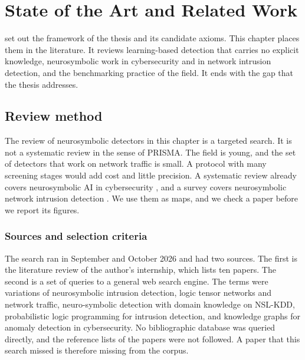 \chapter{State of the Art and Related Work}
\label{ch:related-work}

 set out the framework of the thesis and its candidate axioms. This
chapter places them in the literature. It reviews learning-based
detection that carries no explicit knowledge, neurosymbolic work in
cybersecurity and in network intrusion detection, and the benchmarking
practice of the field. It ends with the gap that the thesis addresses.

\section{Review method}
\label{sec:review-method}

The review of neurosymbolic detectors in this chapter is a targeted search. It
is not a systematic review in the sense of PRISMA. The field is young, and the
set of detectors that work on network traffic is small. A protocol with many
screening stages would add cost and little precision. A systematic review
already covers neurosymbolic AI in cybersecurity
\citep{hakim2025nesycybersecurity}, and a survey covers neurosymbolic network
intrusion detection \citep{bizzarri2025survey}. We use them as maps, and we check a paper before we
report its figures.

\subsection{Sources and selection criteria}
\label{sec:review-sources}

The search ran in September and October 2026 and had two sources. The first is
the literature review of the author's internship, which lists ten papers. The
second is a set of queries to a general web search engine. The terms were
variations of neurosymbolic intrusion detection, logic tensor networks and
network traffic, neuro-symbolic detection with domain knowledge on NSL-KDD,
probabilistic logic programming for intrusion detection, and knowledge graphs
for anomaly detection in cybersecurity. No bibliographic database was queried
directly, and the reference lists of the papers were not followed. A paper that
this search missed is therefore missing from the corpus.

